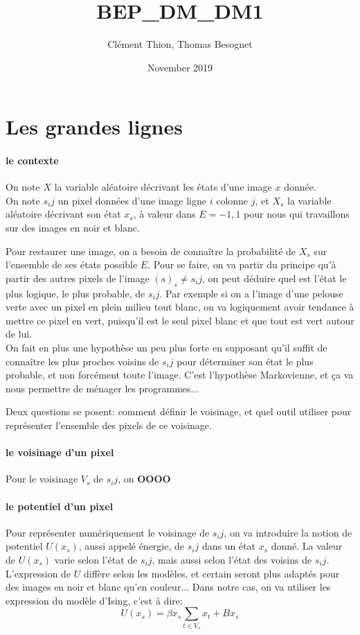 \documentclass[fleqn]{article} %
\title{BEP\_DM\_DM1}
\author{Clément Thion, Thomas Besognet}
\date{November 2019}
\newcounter{question}
\begin{document}
\maketitle

\section{Les grandes lignes}
\paragraph{le contexte}
On note $X$ la variable aléatoire décrivant les états d'une image $x$ donnée.\\
On note $s_ij$ un pixel données d'une image ligne $i$ colonne $j$, et $X_s$ la variable aléatoire décrivant son état $x_s$, à valeur dans $E={-1,1}$ pour nous qui travaillons sur des images en noir et blanc.

Pour restaurer une image, on a besoin de connaître la probabilité de $X_s$ sur l'ensemble de ses états possible $E$. Pour se faire, on va partir du principe qu'à partir des autres pixels de l'image $(s)_s\neq s_ij$, on peut déduire quel est l'état le plus logique, le plus probable, de $s_ij$. Par exemple si on a l'image d'une pelouse verte avec un pixel en plein milieu tout blanc, on va logiquement avoir tendance à mettre ce pixel en vert, puisqu'il est le seul pixel blanc et que tout est vert autour de lui. \\
On fait en plus une hypothèse un peu plus forte en supposant qu'il suffit de connaître les plus proches voisins de $s_ij$ pour déterminer son état le plus probable, et non forcément toute l'image. C'est l'hypothèse Markovienne, et ça va nous permettre de ménager les programmes...

Deux questions se posent: comment définir le voisinage, et quel outil utiliser pour représenter l'ensemble des pixels de ce voisinage.\\
\paragraph{le voisinage d'un pixel} Pour le voisinage $V_s$ de $s_ij$, on \textbf{OOOO}
\paragraph{le potentiel d'un pixel} Pour représenter numériquement le voisinage de $s_ij$, on va introduire la notion de potentiel $U(x_s)$, aussi appelé énergie, de $s_ij$ dans un état $x_s$ donné. La valeur de $U(x_s)$ varie selon l'état de $s_ij$, mais aussi selon l'état des voisins de $s_ij$. L'expression de $U$ diffère selon les modèles, et certain seront plus adaptés pour des images en noir et blanc qu'en couleur... Dans notre cas, on va utiliser les expression du modèle d'Ising\citep{polyrmf}, c'est à dire: \[  U(x_s) = \beta x_s\sum_{t\in V_s}{x_t} +  Bx_s   \]
\end{document}
